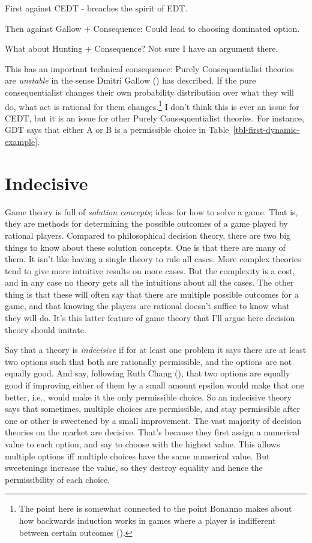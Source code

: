 \documentclass[
  12pt,
  letterpaper,
  DIV=11,
  numbers=noendperiod]{scrreprt}
\begin{document}
First against CEDT - breaches the spirit of EDT.

Then against Gallow + Consequence: Could lead to choosing dominated
option.

What about Hunting + Consequence? Not sure I have an argument there.

This has an important technical consequence: Purely Consequentialist
theories are \emph{unstable} in the sense Dmitri Gallow
() has described. If the pure
consequentialist changes their own probability distribution over what
they will do, what act is rational for them changes.\footnote{The point
  here is somewhat connected to the point Bonanno makes about how
  backwards induction works in games where a player is indifferent
  between certain outcomes ().} I don't think this is ever an issue for CEDT, but it is an
issue for other Purely Consequentialist theories. For instance, GDT says
that either A or B is a permissible choice in
Table~\ref{tbl-first-dynamic-example}.


\chapter{Indecisive}\label{sec-indecisive}

Game theory is full of \emph{solution concepts}; ideas for how to solve
a game. That is, they are methods for determining the possible outcomes
of a game played by rational players. Compared to philosophical decision
theory, there are two big things to know about these solution concepts.
One is that there are many of them. It isn't like having a single theory
to rule all cases. More complex theories tend to give more intuitive
results on more cases. But the complexity is a cost, and in any case no
theory gets all the intuitions about all the cases. The other thing is
that these will often say that there are multiple possible outcomes for
a game, and that knowing the players are rational doesn't suffice to
know what they will do. It's this latter feature of game theory that
I'll argue here decision theory should imitate.

Say that a theory is \emph{indecisive} if for at least one problem it
says there are at least two options such that both are rationally
permissible, and the options are not equally good. And say, following
Ruth Chang (), that two options are
equally good if improving either of them by a small amount epsilon would
make that one better, i.e., would make it the only permissible choice.
So an indecisive theory says that sometimes, multiple choices are
permissible, and stay permissible after one or other is sweetened by a
small improvement. The vast majority of decision theories on the market
are decisive. That's because they first assign a numerical value to each
option, and say to choose with the highest value. This allows multiple
options iff multiple choices have the same numerical value. But
sweetenings increase the value, so they destroy equality and hence the
permissibility of each choice.
\end{document}

